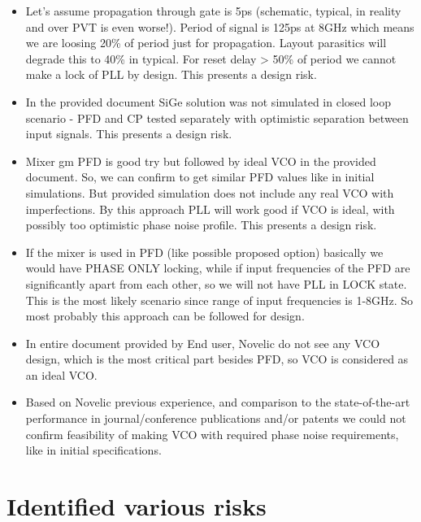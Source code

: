 \documentclass{article}
\begin{document}
\begin{itemize}
	\item Let's assume propagation through gate is 5ps (schematic, typical, in reality and over PVT is even worse!). Period of signal is 125ps at 8GHz which means we are loosing 20\% of period just for propagation. Layout parasitics will degrade this to 40\% in typical. For reset delay > 50\% of period we cannot make a lock of PLL by design. This presents a design risk.
	\item In the provided document SiGe solution was not simulated in closed loop scenario - PFD and CP tested separately with optimistic separation between input signals. This presents a design risk.
	\item Mixer gm PFD is good try but followed by ideal VCO in the provided document.  So, we can confirm to get similar PFD values like in initial simulations. But provided simulation does not include any real VCO with imperfections.  By this approach PLL will work good if VCO is ideal, with possibly too optimistic phase noise profile. This presents a design risk.
	\item If the mixer is used in PFD (like possible proposed option) basically we would have PHASE ONLY locking, while if input frequencies of the PFD are significantly apart from each other, so we will not have PLL in LOCK state. This is the most likely scenario since range of input frequencies is 1-8GHz. So most probably this approach can be followed for design.
	\item In entire document provided by End user, Novelic do not see any VCO design, which is the most critical part besides PFD, so VCO is considered as an ideal VCO.  
	\item Based on Novelic previous experience, and comparison to the state-of-the-art performance in journal/conference publications and/or patents we could not confirm feasibility of making VCO with required phase noise requirements, like in initial specifications. 

\end{itemize}

\section{Identified various risks} %
\end{document}

